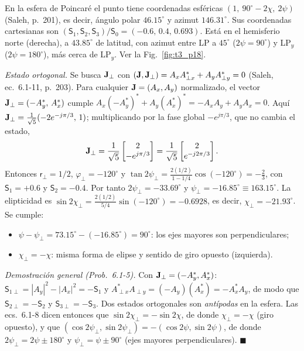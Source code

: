  En la esfera de Poincaré el punto tiene coordenadas esféricas $(1,\ 90^\circ-2\chi,\ 2\psi)$
(Saleh, p.~201), es decir, ángulo polar $46.15^\circ$ y azimut $146.31^\circ$. Sus coordenadas
cartesianas son $(\mathsf S_1,\mathsf S_2,\mathsf S_3)/\mathsf S_0=(-0.6,\,0.4,\,0.693)$. Está en el
hemisferio norte (derecha), a $43.85^\circ$ de latitud, con azimut entre LP a $45^\circ$
($2\psi=90^\circ$) y LP$_y$ ($2\psi=180^\circ$), más cerca de LP$_y$. Ver la Fig.~\ref{fig:t3_p18}.

 \emph{Estado ortogonal.} Se busca $\mathbf J_\perp$ con $(\mathbf J,\mathbf J_\perp)=A_xA_{\perp x}^*+A_yA_{\perp y}^*=0$
(Saleh, ec.~6.1-11, p.~203). Para cualquier $\mathbf J=(A_x,A_y)$ normalizado, el vector
$\mathbf J_\perp=(-A_y^*,\,A_x^*)$ cumple
$A_x(-A_y^*)^*+A_y(A_x^*)^*=-A_xA_y+A_yA_x=0$. Aquí
$\mathbf J_\perp=\frac{1}{\sqrt5}(-2e^{-j\pi/3},\,1)$; multiplicando por la fase global $-e^{j\pi/3}$,
que no cambia el estado,
\[
\mathbf J_\perp=\frac{1}{\sqrt5}\begin{bmatrix}2\\ -e^{j\pi/3}\end{bmatrix}=\frac{1}{\sqrt5}\begin{bmatrix}2\\ e^{-j2\pi/3}\end{bmatrix}.
\]
Entonces $\mathsf r_\perp=1/2$, $\varphi_\perp=-120^\circ$ y
$\tan2\psi_\perp=\frac{2(1/2)}{1-1/4}\cos(-120^\circ)=-\frac23$, con $\mathsf S_{1}=+0.6$ y
$\mathsf S_{2}=-0.4$. Por tanto $2\psi_\perp=-33.69^\circ$ y $\psi_\perp=-16.85^\circ\equiv163.15^\circ$.
La elipticidad es $\sin2\chi_\perp=\frac{2(1/2)}{5/4}\sin(-120^\circ)=-0.6928$, es decir,
$\chi_\perp=-21.93^\circ$. Se cumple:
\begin{itemize}
\item $\psi-\psi_\perp=73.15^\circ-(-16.85^\circ)=90^\circ$: los ejes mayores son perpendiculares;
\item $\chi_\perp=-\chi$: misma forma de elipse y sentido de giro opuesto (izquierda).
\end{itemize}
\emph{Demostración general (Prob.~6.1-5).} Con $\mathbf J_\perp=(-A_y^*,A_x^*)$:
$\mathsf S_{1\perp}=|A_y|^2-|A_x|^2=-\mathsf S_1$ y
$A_{\perp x}^*A_{\perp y}=(-A_y)(A_x^*)=-A_x^*A_y$, de modo que $\mathsf S_{2\perp}=-\mathsf S_2$ y
$\mathsf S_{3\perp}=-\mathsf S_3$. Dos estados ortogonales son \emph{antípodas} en la esfera. Las
ecs.~6.1-8 dicen entonces que $\sin2\chi_\perp=-\sin2\chi$, de donde $\chi_\perp=-\chi$ (giro opuesto), y que
$(\cos2\psi_\perp,\sin2\psi_\perp)=-(\cos2\psi,\sin2\psi)$, de donde $2\psi_\perp=2\psi\pm180^\circ$ y
$\psi_\perp=\psi\pm90^\circ$ (ejes mayores perpendiculares). $\blacksquare$


